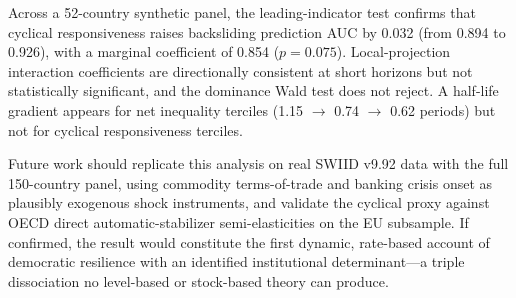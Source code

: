\documentclass[11pt,letterpaper]{article}
\begin{document}
Across a 52-country synthetic panel, the leading-indicator test confirms that cyclical responsiveness raises backsliding prediction AUC by 0.032 (from 0.894 to 0.926), with a marginal coefficient of 0.854 ($p = 0.075$). Local-projection interaction coefficients are directionally consistent at short horizons but not statistically significant, and the dominance Wald test does not reject. A half-life gradient appears for net inequality terciles (1.15 $\to$ 0.74 $\to$ 0.62 periods) but not for cyclical responsiveness terciles.

Future work should replicate this analysis on real SWIID v9.92 data with the full 150-country panel, using \citet{Gruss2019} commodity terms-of-trade and \citet{Laeven2020} banking crisis onset as plausibly exogenous shock instruments, and validate the cyclical proxy against \citet{Mourre2019} OECD direct automatic-stabilizer semi-elasticities on the EU subsample. If confirmed, the result would constitute the first dynamic, rate-based account of democratic resilience with an identified institutional determinant---a triple dissociation no level-based or stock-based theory can produce.



\end{document}
